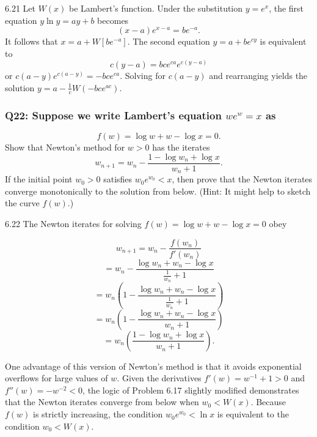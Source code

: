 \documentclass[8pt]{article}
\begin{document}
6.21 Let \( W(x) \) be Lambert’s function. Under the substitution \( y = e^x \), the first equation \( y \ln y = ay + b \) becomes
\[
(x - a)e^{x-a} = be^{-a}.
\]
It follows that \( x = a + W[be^{-a}] \). The second equation \( y = a + b e^{cy} \) is equivalent to
\[
c(y - a) = bce^{ca}e^{c(y-a)}
\]
or \( c(a - y)e^{c(a-y)} = -bce^{ca} \). Solving for \( c(a - y) \) and rearranging yields the solution \( y = a - \frac{1}{c} W(-bce^{ac}) \).

\subsubsection*{Q22: Suppose we write Lambert’s equation \( we^w = x \) as}
\[
f(w) = \log w + w - \log x = 0.
\]
Show that Newton’s method for \( w > 0 \) has the iterates
\[
w_{n+1} = w_n - \frac{1 - \log w_n + \log x}{w_n + 1}.
\]
If the initial point \( w_0 > 0 \) satisfies \( w_0 e^{w_0} < x \), then prove that the Newton iterates converge monotonically to the solution from below. (Hint: It might help to sketch the curve \( f(w) \).)

6.22 The Newton iterates for solving \( f(w) = \log w + w - \log x = 0 \) obey

\[
w_{n+1} = w_n - \frac{f(w_n)}{f'(w_n)}
\]
\[
= w_n - \frac{\log w_n + w_n - \log x}{\frac{1}{w_n} + 1}
\]
\[
= w_n \left( 1 - \frac{\log w_n + w_n - \log x}{\frac{1}{w_n} + 1} \right)
\]
\[
= w_n \left( 1 - \frac{\log w_n + w_n - \log x}{w_n + 1} \right)
\]
\[
= w_n \left( \frac{1 - \log w_n + \log x}{w_n + 1} \right).
\]

One advantage of this version of Newton’s method is that it avoids exponential overflows for large values of \( w \). Given the derivatives \( f'(w) = w^{-1} + 1 > 0 \) and \( f''(w) = -w^{-2} < 0 \), the logic of Problem 6.17 slightly modified demonstrates that the Newton iterates converge from below when \( w_0 < W(x) \). Because \( f(w) \) is strictly increasing, the condition \( w_0 e^{w_0} < \ln x \) is equivalent to the condition \( w_0 < W(x) \).
\end{document}
